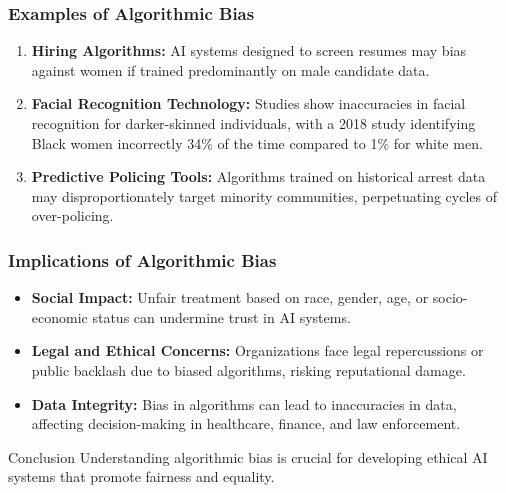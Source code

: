 \documentclass[aspectratio=169]{beamer}
\begin{document}
\begin{frame}[fragile]
    \frametitle{Examples of Algorithmic Bias}
    \begin{enumerate}
        \item \textbf{Hiring Algorithms:} 
        AI systems designed to screen resumes may bias against women if trained predominantly on male candidate data.
        
        \item \textbf{Facial Recognition Technology:} 
        Studies show inaccuracies in facial recognition for darker-skinned individuals, with a 2018 study identifying Black women incorrectly 34\% of the time compared to 1\% for white men.
        
        \item \textbf{Predictive Policing Tools:} 
        Algorithms trained on historical arrest data may disproportionately target minority communities, perpetuating cycles of over-policing.
    \end{enumerate}
\end{frame}

\begin{frame}[fragile]
    \frametitle{Implications of Algorithmic Bias}
    \begin{itemize}
        \item \textbf{Social Impact:} 
        Unfair treatment based on race, gender, age, or socio-economic status can undermine trust in AI systems.
        
        \item \textbf{Legal and Ethical Concerns:} 
        Organizations face legal repercussions or public backlash due to biased algorithms, risking reputational damage.
        
        \item \textbf{Data Integrity:} 
        Bias in algorithms can lead to inaccuracies in data, affecting decision-making in healthcare, finance, and law enforcement.
    \end{itemize}

    \begin{block}{Conclusion}
        Understanding algorithmic bias is crucial for developing ethical AI systems that promote fairness and equality.
    \end{block}
\end{frame}
\end{document}

